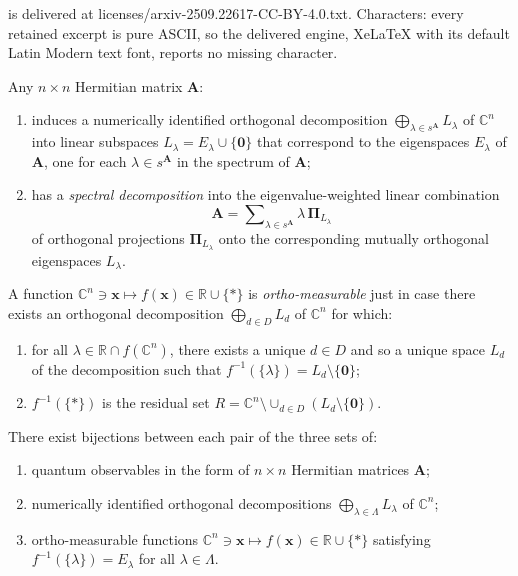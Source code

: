 \documentclass[10pt,a4paper]{amsart}
\newcommand \C { \mathbb{C} }
\newcommand \R { \mathbb{R} }
\begin{document}
is delivered at licenses/arxiv-2509.22617-CC-BY-4.0.txt. Characters: every retained excerpt is pure ASCII, so the delivered engine, XeLaTeX with its default Latin Modern text font, reports no missing character.
\begin{proposition} \label{prop:spectralThm}
	Any $n \times n$ Hermitian matrix $ \mathbf A$:
\begin{enumerate}
	\item induces a numerically identified orthogonal decomposition 
 \( \bigoplus\nolimits _{ \lambda \in s^{ \mathbf A} } L_\lambda \) of $ \C^n $
	into linear subspaces $ L_\lambda = E_\lambda \cup \{ \mathbf 0\} $
	that correspond to the eigenspaces $ E_\lambda $ of $ \mathbf A$,
	one for each $ \lambda \in s^{ \mathbf A} $ in the spectrum of $ \mathbf A$;
	\item has a \emph{spectral decomposition} into the eigenvalue-weighted linear combination 
\begin{equation} \label{eq:spectralDecomp}
	\mathbf A = \sum\nolimits _{ \lambda \in s^{ \mathbf A} } 
	\lambda \, \boldsymbol \Pi _{ L_\lambda }
\end{equation}
	of orthogonal projections $ \boldsymbol \Pi _{ L_\lambda }$ 
	onto the corresponding mutually orthogonal eigenspaces $ L_\lambda $.
\end{enumerate}
\end{proposition}

\begin{definition} \label{def:orthMeasFn}
	A function \( \C^n \owns \mathbf x \mapsto f( \mathbf x) \in \R \cup \{*\} \) 
	is \emph{ortho-measurable} just in case there exists 
	an orthogonal decomposition $ \bigoplus _{d \in D} L_d $ of $ \C^n $ for which:
	\begin{enumerate}
		\item for all $ \lambda \in \R \cap f( \C^n )$, there exists
		a unique $d \in D$ and so a unique space $ L_d $ of the decomposition such that
		 $ f^{-1} ( \{ \lambda \} ) = L_d \setminus \{ \mathbf 0 \}$;
		\item $ f^{-1} ( \{*\} )$ is the residual set 
 \( R = \C^n \setminus \cup _{d \in D} ( L_d \setminus \{ \mathbf 0 \} ) \).
	\end{enumerate}
\end{definition}

\begin{theorem} \label{thm:threeBijections}
	There exist bijections between each pair of the three sets of:
\begin{enumerate}
	\item quantum observables in the form of $n \times n$ Hermitian matrices $ \mathbf A$;
	 \item numerically identified 
	 orthogonal decompositions $ \bigoplus _{ \lambda \in \Lambda } L_\lambda $ of $ \C^n $; 
	\item ortho-measurable functions
	 \( \C^n \owns \mathbf x \mapsto f( \mathbf x) \in \R \cup \{*\} \)
	 satisfying $ f^{-1} ( \{ \lambda \} ) = E_\lambda $ for all $ \lambda \in \Lambda $.
\end{enumerate}
\end{theorem}
\end{document}
